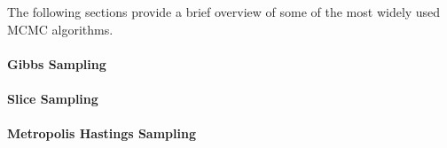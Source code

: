 The following sections provide a brief overview of some of the most widely used MCMC algorithms.  

\paragraph{Gibbs Sampling}
\paragraph{Slice Sampling}
\paragraph{Metropolis Hastings Sampling}
